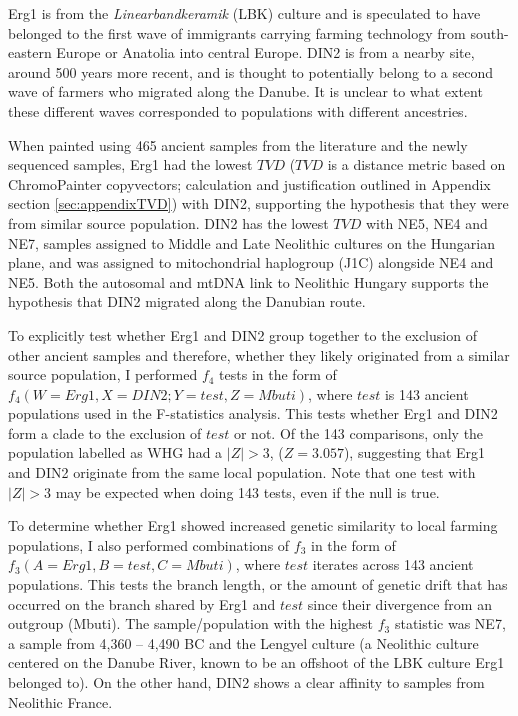 Erg1 is from the \textit{Linearbandkeramik} (LBK) culture and is speculated to have belonged to the first wave of immigrants carrying farming technology from south-eastern Europe or Anatolia into central Europe. DIN2 is from a nearby site, around 500 years more recent, and is thought to potentially belong to a second wave of farmers who migrated along the Danube. It is unclear to what extent these different waves corresponded to populations with different ancestries.  

When painted using 465 ancient samples from the literature and the newly sequenced samples, Erg1 had the lowest $TVD$ ($TVD$ is a distance metric based on ChromoPainter copyvectors; calculation and justification outlined in Appendix section \ref{sec:appendixTVD}) with DIN2, supporting the hypothesis that they were from similar source population. DIN2  has the lowest $TVD$ with NE5, NE4 and NE7, samples assigned to Middle and Late Neolithic cultures on the Hungarian plane, and was assigned to mitochondrial haplogroup (J1C) alongside NE4 and NE5. Both the autosomal and mtDNA link to Neolithic Hungary supports the hypothesis that DIN2 migrated along the Danubian route.   

To explicitly test whether Erg1 and DIN2 group together to the exclusion of other ancient samples and therefore, whether they likely originated from a similar source population, I performed $f_{4}$ tests in the form of $f_{4}(W=Erg1, X=DIN2; Y=test, Z=Mbuti)$, where $test$ is 143 ancient populations used in the F-statistics analysis. This tests whether Erg1 and DIN2 form a clade to the exclusion of $test$ or not. Of the 143 comparisons, only the population labelled as WHG had a $|Z|>3$, ($Z=3.057$), suggesting that Erg1 and DIN2 originate from the same local population. Note that one test with $|Z|>3$ may be expected when doing 143 tests, even if the null is true.

To determine whether Erg1 showed increased genetic similarity to local farming populations, I also performed combinations of $f_{3}$ in the form of $f_{3}(A=Erg1, B=test, C=Mbuti)$, where $test$ iterates across 143 ancient populations. This tests the branch length, or the amount of genetic drift that has occurred on the branch shared by Erg1 and $test$ since their divergence from an outgroup (Mbuti). The sample/population with the highest $f_{3}$ statistic was NE7, a sample from 4,360 – 4,490 BC and the Lengyel culture (a Neolithic culture centered on the Danube River, known to be an offshoot of the LBK culture Erg1 belonged to). On the other hand, DIN2 shows a clear affinity to samples from Neolithic France.

